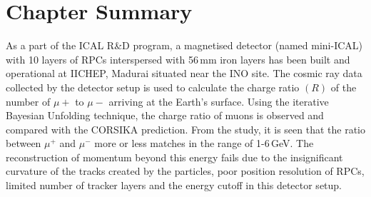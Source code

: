 \section{Chapter Summary}
As a part of the ICAL R\&D program, a magnetised detector
(named mini-ICAL) with 10 layers of RPCs interspersed with 56\,mm iron
layers has been built and operational at IICHEP, Madurai situated
near the INO site. The cosmic ray data collected by the detector
setup is used to calculate the charge ratio $(R)$ of the number
of $\mu+$ to $\mu-$ arriving at the Earth's surface.
Using the iterative Bayesian Unfolding technique, the charge ratio
of muons is observed and compared with the CORSIKA prediction.
From the study, it is seen that the ratio between $\mu^{+}$ and
$\mu^{-}$ more or less matches in the range of 1-6\,GeV.
The reconstruction of momentum beyond this energy fails due to the
insignificant curvature of the tracks created by the particles, poor
position resolution of RPCs, limited number of tracker layers and
the energy cutoff in this detector setup.
